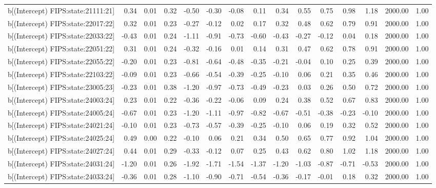 \begin{table}[ht]
\begin{tabular}{rrrrrrrrrrrrrrr}
  b[(Intercept) FIPS:state:21111:21] & 0.34 & 0.01 & 0.32 & -0.50 & -0.30 & -0.08 & 0.11 & 0.34 & 0.55 & 0.75 & 0.98 & 1.18 & 2000.00 & 1.00 \\ 
  b[(Intercept) FIPS:state:22017:22] & 0.32 & 0.01 & 0.23 & -0.27 & -0.12 & 0.02 & 0.17 & 0.32 & 0.48 & 0.62 & 0.79 & 0.91 & 2000.00 & 1.00 \\ 
  b[(Intercept) FIPS:state:22033:22] & -0.43 & 0.01 & 0.24 & -1.11 & -0.91 & -0.73 & -0.60 & -0.43 & -0.27 & -0.12 & 0.04 & 0.18 & 2000.00 & 1.00 \\ 
  b[(Intercept) FIPS:state:22051:22] & 0.31 & 0.01 & 0.24 & -0.32 & -0.16 & 0.01 & 0.14 & 0.31 & 0.47 & 0.62 & 0.78 & 0.91 & 2000.00 & 1.00 \\ 
  b[(Intercept) FIPS:state:22055:22] & -0.20 & 0.01 & 0.23 & -0.81 & -0.64 & -0.48 & -0.35 & -0.21 & -0.04 & 0.10 & 0.25 & 0.39 & 2000.00 & 1.00 \\ 
  b[(Intercept) FIPS:state:22103:22] & -0.09 & 0.01 & 0.23 & -0.66 & -0.54 & -0.39 & -0.25 & -0.10 & 0.06 & 0.21 & 0.35 & 0.46 & 2000.00 & 1.00 \\ 
  b[(Intercept) FIPS:state:23005:23] & -0.23 & 0.01 & 0.38 & -1.20 & -0.97 & -0.73 & -0.49 & -0.23 & 0.03 & 0.26 & 0.50 & 0.72 & 2000.00 & 1.00 \\ 
  b[(Intercept) FIPS:state:24003:24] & 0.23 & 0.01 & 0.22 & -0.36 & -0.22 & -0.06 & 0.09 & 0.24 & 0.38 & 0.52 & 0.67 & 0.83 & 2000.00 & 1.00 \\ 
  b[(Intercept) FIPS:state:24005:24] & -0.67 & 0.01 & 0.23 & -1.20 & -1.11 & -0.97 & -0.82 & -0.67 & -0.51 & -0.38 & -0.23 & -0.10 & 2000.00 & 1.00 \\ 
  b[(Intercept) FIPS:state:24021:24] & -0.10 & 0.01 & 0.23 & -0.73 & -0.57 & -0.39 & -0.25 & -0.10 & 0.06 & 0.19 & 0.32 & 0.52 & 2000.00 & 1.00 \\ 
  b[(Intercept) FIPS:state:24025:24] & 0.49 & 0.00 & 0.22 & -0.10 & 0.06 & 0.21 & 0.34 & 0.50 & 0.65 & 0.77 & 0.92 & 1.04 & 2000.00 & 1.00 \\ 
  b[(Intercept) FIPS:state:24027:24] & 0.44 & 0.01 & 0.29 & -0.33 & -0.12 & 0.07 & 0.25 & 0.43 & 0.62 & 0.80 & 1.02 & 1.18 & 2000.00 & 1.00 \\ 
  b[(Intercept) FIPS:state:24031:24] & -1.20 & 0.01 & 0.26 & -1.92 & -1.71 & -1.54 & -1.37 & -1.20 & -1.03 & -0.87 & -0.71 & -0.53 & 2000.00 & 1.00 \\ 
  b[(Intercept) FIPS:state:24033:24] & -0.36 & 0.01 & 0.28 & -1.10 & -0.90 & -0.71 & -0.54 & -0.36 & -0.17 & -0.01 & 0.18 & 0.32 & 2000.00 & 1.00 \\ 

\end{tabular}
\end{table}
